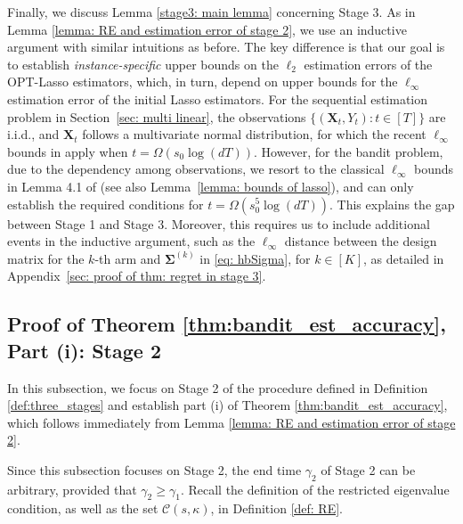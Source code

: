 \documentclass[aos,preprint]{imsart}
\theoremstyle{plain}
\theoremstyle{definition}
\newcommand{\bX}{\boldsymbol{X}}
\newcommand{\bSigma}{\boldsymbol{\Sigma}}
\begin{document}
\begin{appendix}
Finally, we discuss Lemma \ref{stage3: main lemma} concerning Stage 3. As in Lemma \ref{lemma: RE and estimation error of stage 2}, we use an inductive argument with similar intuitions as before. The key difference is that our goal is to establish \textit{instance-specific} upper bounds on the $\ell_2$ estimation errors of the OPT-Lasso estimators, which, in turn, depend on upper bounds for the $\ell_{\infty}$ estimation error of the initial Lasso estimators.  For the sequential estimation problem in Section~\ref{sec: multi linear}, the observations $\{(\bX_t, Y_t): t \in [T]\}$ are i.i.d., and $\bX_t$ follows a multivariate normal distribution, for which the recent $\ell_{\infty}$ bounds in \cite{bellec2022biasing} apply when $t = \Omega(s_0 \log(dT))$.  However, for the bandit problem, due to the dependency among observations, we resort to the classical $\ell_{\infty}$ bounds in Lemma 4.1 of \cite{van2016estimation} (see also Lemma~\ref{lemma: bounds of lasso}), and can only establish the required conditions for $t = \Omega(s_0^5 \log(dT))$. This explains the gap between Stage 1 and Stage 3. 
Moreover, this requires us to include additional events in the inductive argument, such as the $\ell_{\infty}$ distance between the design matrix for the $k$-th arm and $\bSigma^{(k)}$ in \eqref{eq: hbSigma}, for $k \in [K]$, as detailed in Appendix~\ref{sec: proof of thm: regret in stage 3}.






  

  


 






\subsection{Proof of Theorem \ref{thm:bandit_est_accuracy}, Part (i): Stage 2} \label{sec: proof of thm: regret in stage 2}
In this subsection, we focus on Stage 2 of the procedure defined in Definition \ref{def:three_stages} and establish part (i) of Theorem \ref{thm:bandit_est_accuracy}, which follows immediately from Lemma \ref{lemma: RE and estimation error of stage 2}. 

Since this subsection focuses on Stage 2, the end time $\gamma_2$ of Stage 2 can be arbitrary, provided that $\gamma_2 \geq \gamma_1$. Recall the definition of the restricted eigenvalue condition, as well as the set $\mathcal{C}(s,\kappa)$, in Definition \ref{def: RE}.




\end{appendix}
\end{document}
